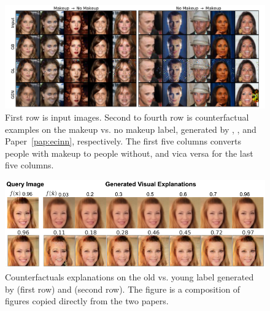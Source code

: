 \documentclass[11pt,a4paper,twoside,openright,final]{memoir}
\newcommand*{\paperref}[1]{Paper~\hyperref[#1]{\ref{#1}}}
\begin{document}
\begin{figure}
    \centering
    \includegraphics[trim={67, 10, 0, 0}, clip, width=\textwidth]{graphics/celeba.pdf} 
    \caption{First row is input images. Second to fourth row is counterfactual examples on the makeup vs. no makeup label, generated by \cite{Wachter2017}, \cite{VanLooveren2019}, and \paperref{pap:ecinn}, respectively. The first five columns converts people with makeup to people without, and vica versa for the last five columns.}
    \label{fig:iterative-counterfactuals-copied}
\end{figure}
\begin{figure}[b]
    \centering
    \includegraphics[width=\linewidth]{graphics/generative.png}
    \caption{Counterfactuals explanations on the old vs. young label generated by \cite{Rodriguez2021} (first row) and \cite{Singla2019} (second row). The figure is a composition of figures copied directly from the two papers.} 
    \label{fig:generative-counterfactuals-copied}
\end{figure}
\end{document}
